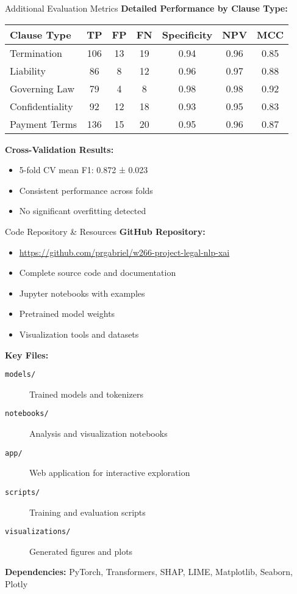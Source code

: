 \begin{frame}{Additional Evaluation Metrics}
\textbf{Detailed Performance by Clause Type:}
\begin{table}[h]
\centering
\scriptsize
\begin{tabular}{@{}lcccccc@{}}
\toprule
\textbf{Clause Type} & \textbf{TP} & \textbf{FP} & \textbf{FN} & \textbf{Specificity} & \textbf{NPV} & \textbf{MCC} \\
\midrule
Termination & 106 & 13 & 19 & 0.94 & 0.96 & 0.85 \\
Liability & 86 & 8 & 12 & 0.96 & 0.97 & 0.88 \\
Governing Law & 79 & 4 & 8 & 0.98 & 0.98 & 0.92 \\
Confidentiality & 92 & 12 & 18 & 0.93 & 0.95 & 0.83 \\
Payment Terms & 136 & 15 & 20 & 0.95 & 0.96 & 0.87 \\
\bottomrule
\end{tabular}
\end{table}

\vspace{0.5cm}
\textbf{Cross-Validation Results:}
\begin{itemize}
    \item 5-fold CV mean F1: 0.872 ± 0.023
    \item Consistent performance across folds
    \item No significant overfitting detected
\end{itemize}
\end{frame}

\begin{frame}{Code Repository \& Resources}
\textbf{GitHub Repository:}
\begin{itemize}
    \item \url{https://github.com/prgabriel/w266-project-legal-nlp-xai}
    \item Complete source code and documentation
    \item Jupyter notebooks with examples
    \item Pretrained model weights
    \item Visualization tools and datasets
\end{itemize}

\vspace{0.5cm}
\textbf{Key Files:}
\begin{description}
    \item[\texttt{models/}] Trained models and tokenizers
    \item[\texttt{notebooks/}] Analysis and visualization notebooks  
    \item[\texttt{app/}] Web application for interactive exploration
    \item[\texttt{scripts/}] Training and evaluation scripts
    \item[\texttt{visualizations/}] Generated figures and plots
\end{description}

\vspace{0.5cm}
\textbf{Dependencies:}
PyTorch, Transformers, SHAP, LIME, Matplotlib, Seaborn, Plotly
\end{frame}

